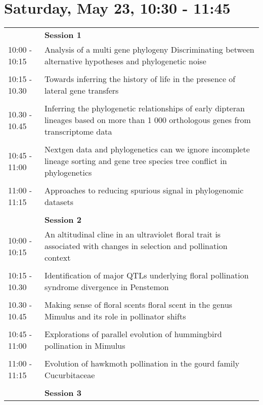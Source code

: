 \documentclass{article}
\begin{document}
\section{Saturday, May 23, 10:30 - 11:45}
\begin{longtabu} to \textwidth {lX}
 & \textbf{Session 1} \\ 

10:00 - 10:15 & Analysis of a multi gene phylogeny  Discriminating between alternative hypotheses and phylogenetic noise \\ 
 &  \\ 
10:15 - 10.30 & Towards inferring the history of life in the presence of lateral gene transfers \\ 
 &  \\ 
10.30 - 10.45 & Inferring the phylogenetic relationships of early dipteran lineages based on more than 1 000 orthologous genes from transcriptome data \\ 
 &  \\ 
10:45 - 11:00 & Nextgen data and phylogenetics   can we ignore incomplete lineage sorting and gene tree species tree conflict in phylogenetics \\ 
 &  \\ 
11:00 - 11:15 & Approaches to reducing spurious signal in phylogenomic datasets \\ 
 &  \\ 
 & \textbf{Session 2} \\ 

10:00 - 10:15 & An altitudinal cline in an ultraviolet floral trait is associated with changes in selection and pollination context \\ 
 &  \\ 
10:15 - 10.30 & Identification of major QTLs underlying floral pollination syndrome divergence in Penstemon \\ 
 &  \\ 
10.30 - 10.45 & Making sense of floral scents  floral scent in the genus Mimulus and its role in pollinator shifts \\ 
 &  \\ 
10:45 - 11:00 & Explorations of parallel evolution of hummingbird pollination in Mimulus \\ 
 &  \\ 
11:00 - 11:15 & Evolution of hawkmoth pollination in the gourd family  Cucurbitaceae \\ 
 &  \\ 
 & \textbf{Session 3} \\ 


\end{longtabu}
\end{document}
